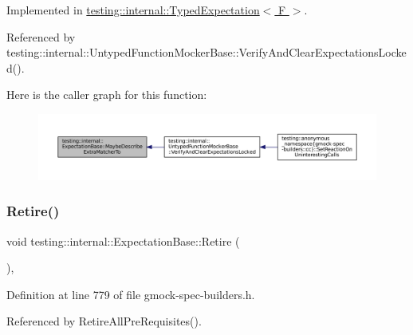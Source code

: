 Implemented in \hyperlink{classtesting_1_1internal_1_1TypedExpectation_ab019251041a408dc5a5d8ae216be53f4}{testing\+::internal\+::\+Typed\+Expectation$<$ F $>$}.



Referenced by testing\+::internal\+::\+Untyped\+Function\+Mocker\+Base\+::\+Verify\+And\+Clear\+Expectations\+Locked().

Here is the caller graph for this function\+:
\nopagebreak
\begin{figure}[H]
\begin{center}
\leavevmode
\includegraphics[width=350pt]{classtesting_1_1internal_1_1ExpectationBase_a5ce4f648c7b112d27b798711d1e3ff5b_icgraph}
\end{center}
\end{figure}
\mbox{\label{classtesting_1_1internal_1_1ExpectationBase_a0aeeb4c1e66c2f2aa0853c267ad3e781}} 
\subsubsection{\texorpdfstring{Retire()}{Retire()}}
{\footnotesize\ttfamily void testing\+::internal\+::\+Expectation\+Base\+::\+Retire (\begin{DoxyParamCaption}{ }\end{DoxyParamCaption})\hspace{0.3cm}{\ttfamily [inline]}, {\ttfamily [protected]}}



Definition at line 779 of file gmock-\/spec-\/builders.\+h.



Referenced by Retire\+All\+Pre\+Requisites().


